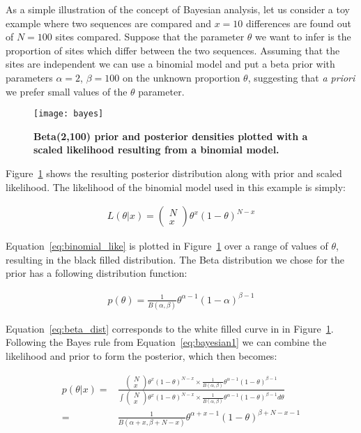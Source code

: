 As a simple illustration of the concept of Bayesian analysis, let us consider a toy example where two sequences are compared and $x=10$ differences are found out of $N=100$ sites compared.
Suppose that the parameter $\theta$ we want to infer is the proportion of sites which differ between the two sequences.
Assuming that the sites are independent we can use a binomial model and put a beta prior with parameters $\alpha=2$, $\beta=100$ on the unknown proportion $\theta$, suggesting that \textit{a priori} we prefer small values of the $\theta$ parameter.

\begin{figure}[h!]
\centering
\texttt{[image: bayes]} 
\caption{
{ \footnotesize 
{\bf Beta(2,100) prior and posterior densities plotted with a scaled likelihood resulting from a binomial model.} 
}%
}
\label{fig:bayes1}
\end{figure}

Figure~\ref{fig:bayes1} shows the resulting posterior distribution along with prior and scaled likelihood.
The likelihood of the binomial model used in this example is simply:

\begin{align}
L\left(\theta|x\right)=\left(\begin{array}{c}
N\\
x
\end{array}\right)\theta^{x}(1-\theta)^{N-x}
\label{eq:binomial_like}
\end{align}

Equation~\ref{eq:binomial_like} is plotted in Figure~\ref{fig:bayes1} over a range of values of $\theta$, resulting in the black filled distribution.
The Beta distribution we chose for the prior has a following distribution function:

\begin{align}
p(\theta)=\frac{1}{B\left(\alpha,\beta\right)}\theta^{\alpha-1}(1-\alpha)^{\beta-1}
\label{eq:beta_dist}
\end{align}

Equation~\ref{eq:beta_dist} corresponds to the white filled curve in in Figure~\ref{fig:bayes1}.
Following the Bayes rule from Equation~\ref{eq:bayesian1} we can combine the likelihood and prior to form the posterior, which then becomes:

\begin{eqnarray}
p\left(\theta|x\right)=& \frac{\left(\begin{array}{c}
N\\
x
\end{array}\right)\theta^{x}(1-\theta)^{N-x}\times\frac{1}{B\left(\alpha,\beta\right)}\theta^{\alpha-1}\left(1-\theta\right)^{\beta-1}}{\int\left(\begin{array}{c}
N\\
x
\end{array}\right)\theta^{x}(1-\theta)^{N-x}\times\frac{1}{B\left(\alpha,\beta\right)}\theta^{\alpha-1}\left(1-\theta\right)^{\beta-1}d\theta} \nonumber \\
=& \frac{1}{B\left(\alpha+x,\beta+N-x\right)}\theta^{\alpha+x-1}(1-\theta)^{\beta+N-x-1}
\label{eq:beta_binom_post}
\end{eqnarray}
 
